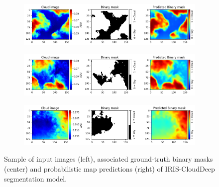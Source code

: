 \documentclass[amt, article]{copernicus}
\begin{document}
\begin{figure}[t]
    \centering
    
    \begin{subfigure}{\textwidth}
        \centering
        \includegraphics[width=1.0\linewidth]{figures/test_dl_15epochs.png}
    \end{subfigure}
    
    \begin{subfigure}{\textwidth}
        \centering
        \includegraphics[width=1.0\linewidth]{figures/test_dl_15epochs2.png}
    \end{subfigure}
    
    \begin{subfigure}{\textwidth}
        \centering
        \includegraphics[width=1.0\linewidth]{figures/test_dl_15epochs3.png}
    \end{subfigure}

    \caption{Sample of input images (left), associated ground-truth binary masks (center) and probabilistic map predictions (right) of IRIS-CloudDeep segmentation model.}
    \label{fig:sample_segmentation}
\end{figure}
\end{document}
